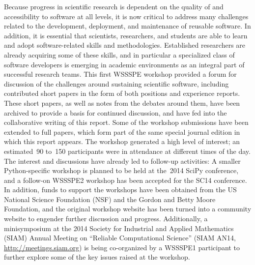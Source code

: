 \documentclass[11pt, oneside]{amsart}
\newcommand{\note}[1]{ {\textcolor{red}    { #1 }}}
\begin{document}
Because progress in scientific research is dependent on the quality of
and accessibility to software at all levels, it is now critical to
address many challenges related to the development, deployment, and
maintenance of reusable software.
In addition, it is essential that scientists, researchers, and
students are able to learn and adopt software-related skills and
methodologies. Established researchers are already acquiring some of
these skills, and in particular a specialized class of software
developers is emerging in academic environments as an integral part of
successful research teams. This first WSSSPE workshop provided a forum
for discussion of the challenges around sustaining scientific
software, including contributed short papers in the form of both
positions and experience reports. These short papers, as well as notes
from the debates around them, have been archived to provide a basis
for continued discussion, and have fed into the collaborative writing
of this report.  Some of the workshop submissions have been extended
to full papers, which form part of the same special journal edition in
which this report appears. The workshop generated a high level of
interest; an estimated~90 to~150 participants were in attendance at
different times of the day. The interest and discussions have already
led to follow-up activities: A smaller Python-specific workshop is
planned to be held at the~2014 SciPy conference, and a follow-on
WSSSPE2 workshop has been accepted for
the SC14 conference. In addition, funds to support the workshops have
been obtained from the US National Science Foundation (NSF) and the
Gordon and Betty Moore Foundation, and the original workshop website
has been turned into a community website to engender further
discussion and progress. Additionally, a minisymposium at the 2014
Society for Industrial and Applied Mathematics (SIAM) Annual Meeting
on ``Reliable Computational Science'' (SIAM AN14,
\url{http://meetings.siam.org}) is being co-organized by a WSSSPE1
participant to further explore some of the key issues raised at the
workshop.
\end{document}
